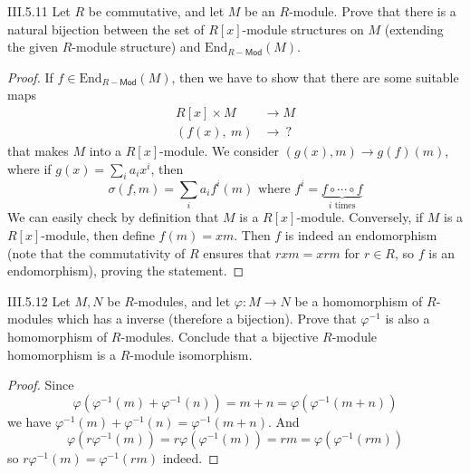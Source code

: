 \begin{problem}{III.5.11}
Let $R$ be commutative, and let $M$ be an $R$-module. Prove that there is a natural bijection between the set of $R[x]$-module structures on $M$ (extending the given $R$-module structure) and $\text{End}_{R-\mathsf{Mod}}(M)$.
\end{problem}
\begin{proof}
If $f \in \text{End}_{R-\textsf{Mod}}(M)$, then we have to show that there are some suitable maps
\begin{align*}
R[x] \times M &\to M \\
(f(x), \:m) &\to \: ?
\end{align*}
that makes $M$ into a $R[x]$-module. We consider $(g(x),m) \to g(f)(m)$, where if $g(x) = \sum_i a_i x^i$, then
\[
\sigma(f,m) = \sum_{i} a_i f^i(m) \text{ where } f^i = \underbrace{f \circ \cdots \circ f}_{i\text{ times}}
\]
We can easily check by definition that $M$ is a $R[x]$-module. Conversely, if $M$ is a $R[x]$-module, then define $f(m) = xm$. Then $f$ is indeed an endomorphism (note that the commutativity of $R$ ensures that $rxm = xrm$ for $r \in R$, so $f$ is an endomorphism), proving the statement.
\end{proof}

\begin{problem}{III.5.12}
Let $M,N$ be $R$-modules, and let $\varphi:M \to N$ be a homomorphism of $R$-modules which has a inverse (therefore a bijection). Prove that $\varphi^{-1}$ is also a homomorphism of $R$-modules. Conclude that a bijective $R$-module homomorphism is a $R$-module isomorphism.
\end{problem}
\begin{proof}
Since
\[
\varphi(\varphi^{-1}(m) + \varphi^{-1}(n)) = m + n = \varphi(\varphi^{-1}(m + n))
\]
we have $\varphi^{-1}(m) + \varphi^{-1}(n) = \varphi^{-1}(m + n)$. And
\[
\varphi(r\varphi^{-1}(m)) = r\varphi(\varphi^{-1}(m)) = rm = \varphi(\varphi^{-1}(rm))
\]
so $r\varphi^{-1}(m) = \varphi^{-1}(rm)$ indeed. 
\end{proof}


